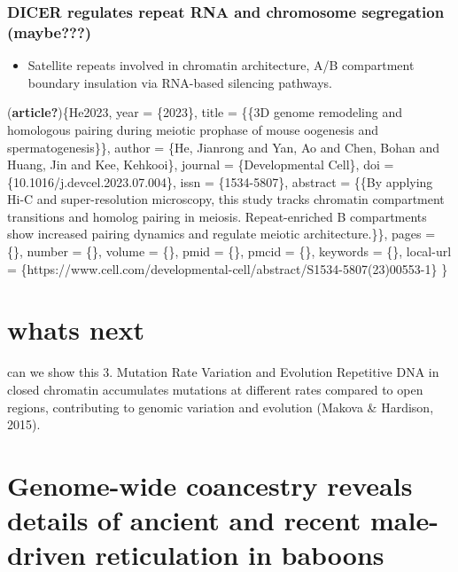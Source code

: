 \documentclass[
  a4paper,
  openany]{scrbook}
\providecommand{\tightlist}{%
  \setlength{\itemsep}{0pt}\setlength{\parskip}{0pt}}
\begin{document}
\subsection{DICER regulates repeat RNA and chromosome segregation
(maybe???)}\label{dicer-regulates-repeat-rna-and-chromosome-segregation-maybe}

\begin{itemize}
\tightlist
\item
  Satellite repeats involved in chromatin architecture, A/B compartment
  boundary insulation via RNA-based silencing pathways.
\end{itemize}

(\textbf{article?})\{He2023, year = \{2023\}, title = \{\{3D genome
remodeling and homologous pairing during meiotic prophase of mouse
oogenesis and spermatogenesis\}\}, author = \{He, Jianrong and Yan, Ao
and Chen, Bohan and Huang, Jin and Kee, Kehkooi\}, journal =
\{Developmental Cell\}, doi = \{10.1016/j.devcel.2023.07.004\}, issn =
\{1534-5807\}, abstract = \{\{By applying Hi-C and super-resolution
microscopy, this study tracks chromatin compartment transitions and
homolog pairing in meiosis. Repeat-enriched B compartments show
increased pairing dynamics and regulate meiotic architecture.\}\}, pages
= \{\}, number = \{\}, volume = \{\}, pmid = \{\}, pmcid = \{\},
keywords = \{\}, local-url =
\{https://www.cell.com/developmental-cell/abstract/S1534-5807(23)00553-1\}
\}

\chapter{whats next}\label{whats-next}

can we show this 3. Mutation Rate Variation and Evolution Repetitive DNA
in closed chromatin accumulates mutations at different rates compared to
open regions, contributing to genomic variation and evolution (Makova \&
Hardison, 2015).

\begin{figure}


\caption{\label{fig-fig_1_kantorovitz}}

\end{figure}%

\chapter{Genome-wide coancestry reveals details of ancient and recent
male-driven reticulation in
baboons}\label{genome-wide-coancestry-reveals-details-of-ancient-and-recent-male-driven-reticulation-in-baboons}
\end{document}
